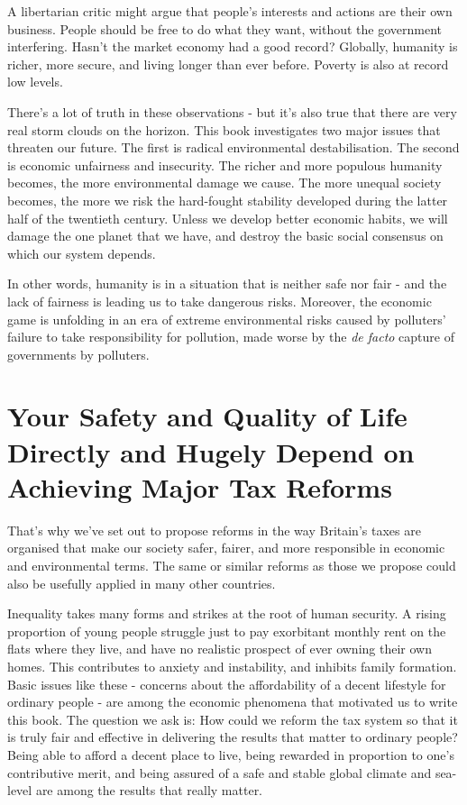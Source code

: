 \documentclass[]{tufte-handout}
\begin{document}
A libertarian critic might argue that people's interests and actions are
their own business. People should be free to do what they want, without
the government interfering. Hasn't the market economy had a good record?
Globally, humanity is richer, more secure, and living longer than ever
before. Poverty is also at record low levels.

There's a lot of truth in these observations - but it's also true that
there are very real storm clouds on the horizon. This book investigates
two major issues that threaten our future. The first is radical
environmental destabilisation. The second is economic unfairness and
insecurity. The richer and more populous humanity becomes, the more
environmental damage we cause. The more unequal society becomes, the
more we risk the hard-fought stability developed during the latter half
of the twentieth century. Unless we develop better economic habits, we
will damage the one planet that we have, and destroy the basic social
consensus on which our system depends.

In other words, humanity is in a situation that is neither safe nor fair
- and the lack of fairness is leading us to take dangerous risks.
Moreover, the economic game is unfolding in an era of extreme
environmental risks caused by polluters' failure to take responsibility
for pollution, made worse by the \emph{de facto} capture of governments
by polluters.

\hypertarget{your-safety-and-quality-of-life-directly-and-hugely-depend-on-achieving-major-tax-reforms}{%
\section{Your Safety and Quality of Life Directly and Hugely Depend on
Achieving Major Tax
Reforms}\label{your-safety-and-quality-of-life-directly-and-hugely-depend-on-achieving-major-tax-reforms}}

That's why we've set out to propose reforms in the way Britain's taxes
are organised that make our society safer, fairer, and more responsible
in economic and environmental terms. The same or similar reforms as
those we propose could also be usefully applied in many other countries.

Inequality takes many forms and strikes at the root of human security. A
rising proportion of young people struggle just to pay exorbitant
monthly rent on the flats where they live, and have no realistic
prospect of ever owning their own homes. This contributes to anxiety and
instability, and inhibits family formation. Basic issues like these -
concerns about the affordability of a decent lifestyle for ordinary
people - are among the economic phenomena that motivated us to write
this book. The question we ask is: How could we reform the tax system so
that it is truly fair and effective in delivering the results that
matter to ordinary people? Being able to afford a decent place to live,
being rewarded in proportion to one's contributive merit, and being
assured of a safe and stable global climate and sea-level are among the
results that really matter.
\end{document}
